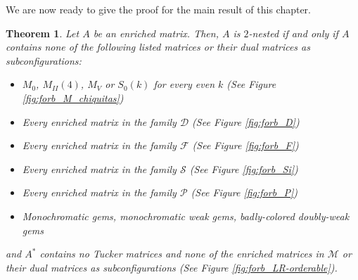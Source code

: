 \documentclass[12pt]{book}
\theoremstyle{plain}
\newtheorem{teo}{Theorem}[chapter]
\theoremstyle{remark}
\newcommand*{\tagg}{\mathrm{tag}}%
\begin{document}

We are now ready to give the proof for the main result of this chapter.

\begin{teo}
	Let $A$ be an enriched matrix. Then, $A$ is $2$-nested if and only if $A$ contains none of the following listed matrices or their dual matrices as subconfigurations: 
	\begin{itemize}		
	\item $M_0$, $M_{II}(4)$, $M_V$ or $S_0(k)$ for every even $k$ (See Figure \ref{fig:forb_M_chiquitas})
	\item Every enriched matrix in the family $\mathcal{D}$ (See Figure \ref{fig:forb_D}) %
	\item Every enriched matrix in the family $\mathcal{F}$ (See Figure \ref{fig:forb_F}) %
	\item Every enriched matrix in the family $\mathcal{S}$ (See Figure \ref{fig:forb_Si})
	\item Every enriched matrix in the family $\mathcal{P}$ (See Figure \ref{fig:forb_P})
	\item Monochromatic gems, monochromatic weak gems, badly-colored doubly-weak gems 
	\end{itemize}
and $A^*$ contains no Tucker matrices and none of the enriched matrices in $\mathcal{M}$ or their dual matrices as subconfigurations (See Figure \ref{fig:forb_LR-orderable}).

\end{teo} 
\end{document}
